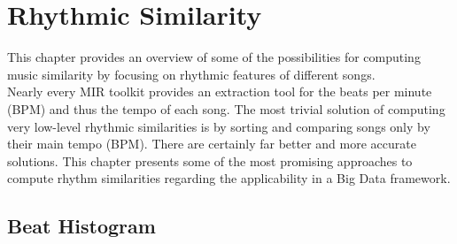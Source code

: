 \section{Rhythmic Similarity}\label{rhythmsimc}

This chapter provides an overview of some of the possibilities for computing music similarity by focusing on rhythmic features of different songs. \\
Nearly every MIR toolkit provides an extraction tool for the beats per minute (BPM) and thus the tempo of each song. The most trivial solution of computing very low-level rhythmic similarities is by sorting and comparing songs only by their main tempo (BPM). There are certainly far better and more accurate solutions.
This chapter presents some of the most promising approaches to compute rhythm similarities regarding the applicability in a Big Data framework.\\

\subsection{Beat Histogram}\label{beathist}

